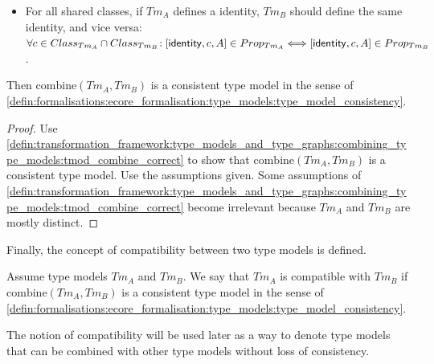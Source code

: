 \begin{lem}
\begin{itemize}
    \item For all shared classes, if $Tm_{A}$ defines a identity, $Tm_{B}$ should define the same identity, and vice versa: $\forall c \in Class_{Tm_A} \cap Class_{Tm_B}\!: [ \mathsf{identity}, c, A ] \in Prop_{Tm_A} \Longleftrightarrow [ \mathsf{identity}, c, A ] \in Prop_{Tm_B}$.
\end{itemize}

Then $\mathrm{combine}(Tm_A, Tm_B)$ is a consistent type model in the sense of \cref{defin:formalisations:ecore_formalisation:type_models:type_model_consistency}.
\end{lem}

\begin{proof}
Use \cref{defin:transformation_framework:type_models_and_type_graphs:combining_type_models:tmod_combine_correct} to show that $\mathrm{combine}(Tm_A, Tm_B)$ is a consistent type model. Use the assumptions given. Some assumptions of \cref{defin:transformation_framework:type_models_and_type_graphs:combining_type_models:tmod_combine_correct} become irrelevant because $Tm_A$ and $Tm_B$ are mostly distinct.
\end{proof}

Finally, the concept of compatibility between two type models is defined.

\begin{defin}
\label{defin:transformation_framework:type_models_and_type_graphs:combining_type_models:compatibility}
Assume type models $Tm_A$ and $Tm_B$. We say that $Tm_A$ is compatible with $Tm_B$ if $\mathrm{combine}(Tm_A, Tm_B)$ is a consistent type model in the sense of \cref{defin:formalisations:ecore_formalisation:type_models:type_model_consistency}.
\end{defin}

The notion of compatibility will be used later as a way to denote type models that can be combined with other type models without loss of consistency.